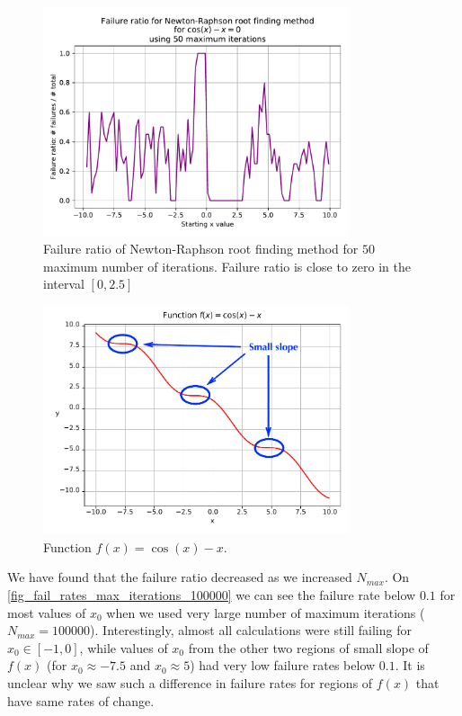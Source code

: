 \begin{figure}[H]
  \centering
  \includegraphics[width=0.8\textwidth]{figures/plot_max_iterations_50.pdf}
  \caption{Failure ratio of Newton-Raphson root finding method for $50$ maximum number of iterations. Failure ratio is close to zero in the interval $[0, 2.5]$}
  \label{fig_fail_rates_max_iterations_50}
\end{figure}
\begin{figure}[H]
  \centering
  \includegraphics[width=0.8\textwidth]{figures/cos_x_minus_x.pdf}
  \caption{Function $f(x) = \cos(x) - x$.}
  \label{fig_cos_x_minus_x}
\end{figure}
We have found that the failure ratio decreased as we increased $N_{max}$. On \autoref{fig_fail_rates_max_iterations_100000} we can see the failure rate below $0.1$ for most values of $x_0$ when we used very large number of maximum iterations ($N_{max}=\num{100000}$). Interestingly, almost all calculations were still failing for $x_0 \in [-1, 0]$, while values of $x_0$ from the other two regions of small slope of $f(x)$ (for $x_0 \approx -7.5$ and $x_0 \approx 5$) had very low failure rates below $0.1$. It is unclear why we saw such a difference in failure rates for regions of $f(x)$ that have same rates of change.

